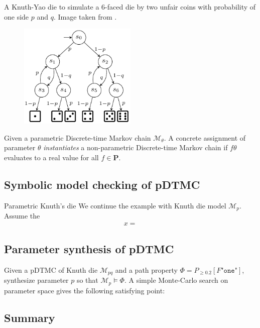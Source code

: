 \begin{example}
    A Knuth-Yao die to simulate a 6-faced die by two unfair coins with probability of one
    side $p$ and $q$. Image taken from \cite{katoen2016probabilistic}.
    \begin{figure}[H]
        \centering
        \includegraphics[width=0.5\textwidth]{figures/knuth_die_pq.png}
        \label{fig:knuth-die-pq}
    \end{figure}
\end{example}

Given a parametric Discrete-time Markov chain $\mathcal{M}_\theta$. A concrete assignment of parameter $\theta$
\textit{instantiates} a non-parametric Discrete-time Markov chain if $f{\theta}$ evaluates to a
real value for all $f\in\mathbf{P}$.

\subsection{Symbolic model checking of pDTMC}

\begin{example}{Parametric Knuth's die}
    We continue the example with Knuth die model $\mathcal{M}_{p}$. Assume the
    \begin{align*}
        x =
    \end{align*}
\end{example}

\subsection{Parameter synthesis of pDTMC}

\begin{example}
    Given a pDTMC of Knuth die $\mathcal{M}_{pq}$ and a path property $\Phi = P_{\geq 0.2} [F
                \texttt{"one"}]$, synthesize parameter $p$ so that $\mathcal{M}_{p} \models \Phi$. A simple
    Monte-Carlo search on parameter space gives the following satisfying point:
\end{example}

\subsection{Summary}